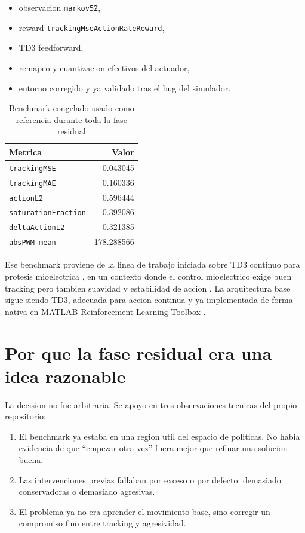 \documentclass[11pt,a4paper]{article}
\begin{document}
\begin{itemize}[leftmargin=1.6em]
\item observacion \texttt{markov52},
\item reward \texttt{trackingMseActionRateReward},
\item TD3 feedforward,
\item remapeo y cuantizacion efectivos del actuador,
\item entorno corregido y ya validado tras el bug del simulador.
\end{itemize}

\begin{table}[H]
\centering
\caption{Benchmark congelado usado como referencia durante toda la fase residual}
\begin{tabular}{lr}
\toprule
Metrica & Valor \\
\midrule
\texttt{trackingMSE} & 0.043045 \\
\texttt{trackingMAE} & 0.160336 \\
\texttt{actionL2} & 0.596444 \\
\texttt{saturationFraction} & 0.392086 \\
\texttt{deltaActionL2} & 0.321385 \\
\texttt{absPWM mean} & 178.288566 \\
\bottomrule
\end{tabular}
\end{table}

Ese benchmark proviene de la linea de trabajo iniciada sobre TD3 continuo para protesis mioelectrica \cite{fuertes2026continuous}, en un contexto donde el control mioelectrico exige buen tracking pero tambien suavidad y estabilidad de accion \cite{chen2023review}. La arquitectura base sigue siendo TD3, adecuada para accion continua y ya implementada de forma nativa en MATLAB Reinforcement Learning Toolbox \cite{fujimoto2018td3,mathworks_td3_agent,mathworks_td3_options}.

\section{Por que la fase residual era una idea razonable}

La decision no fue arbitraria. Se apoyo en tres observaciones tecnicas del propio repositorio:

\begin{enumerate}[leftmargin=1.6em]
\item El benchmark ya estaba en una region util del espacio de politicas. No habia evidencia de que ``empezar otra vez'' fuera mejor que refinar una solucion buena.
\item Las intervenciones previas fallaban por exceso o por defecto: demasiado conservadoras o demasiado agresivas.
\item El problema ya no era aprender el movimiento base, sino corregir un compromiso fino entre tracking y agresividad.
\end{enumerate}
\end{document}
